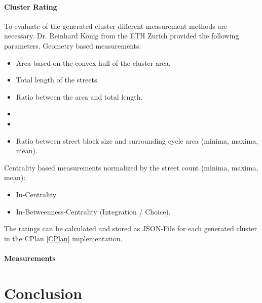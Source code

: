 \documentclass[11pt, a4paper]{report}
\begin{document}
\subsubsection{Cluster Rating}
To evaluate of the generated cluster different measurement methods are necessary. Dr. Reinhard König from the ETH Zurich provided the following parameters.
\newline
Geometry based measurements:
\begin{itemize}
    \item Area based on the convex hull of the cluster area.
    \item Total length of the streets.
    \item Ratio between the area and total length.
    \item %
    \item %
    \item Ratio between street block size and surrounding cycle area (minima, maxima, mean).%
\end{itemize}
Centrality based measurements normalized by the street count (minima, maxima, mean):
\begin{itemize}
    \item In-Centrality
    \item In-Betweenness-Centrality (Integration / Choice).
\end{itemize}


The ratings can be calculated and stored as JSON-File for each generated cluster in the CPlan \ref{CPlan} implementation.

\subsubsection{Measurements}
\label{sec:measurements}



\chapter{Conclusion}


\appendix
\glsaddall
\printglossaries
\end{document}
